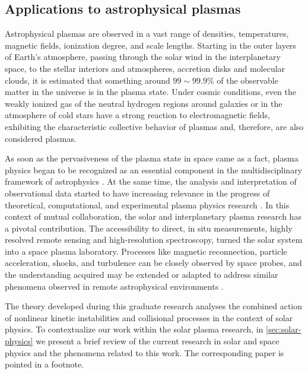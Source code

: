 \documentclass[12pt,a4paper,ruledheader]{report}
\begin{document}
\begin{appendix}
\chapter{Applications to astrophysical plasmas}
\label{appE}
Astrophysical plasmas are observed in a vast range of densities, temperatures,
magnetic fields, ionization degree, and scale lengths\cite{peratt2014}. Starting
in the outer layers of Earth's atmosphere, passing through the solar wind in the
interplanetary space, to the stellar interiors and atmospheres, accretion disks
and molecular clouds, it is estimated that something around $99 \sim 99.9\%$ of the
observable matter in the universe is in the plasma state. Under cosmic conditions,
even the weakly ionized gas of the neutral hydrogen regions around galaxies or in
the atmosphere of cold stars have a strong reaction to electromagnetic fields,
exhibiting the characteristic collective behavior of plasmas and, therefore, are
also considered plasmas\cite{tsypa,may,peratt2014}.

As soon as the pervasiveness of the plasma state in space came as a fact,
plasma physics began to be recognized as an essential component in the
multidisciplinary framework of astrophysics \cite{Alfven1950,Parker1956,
  Alfven1961,Gailitis1964,Alfven1971}. At the same time, the analysis and
interpretation of observational data started to have increasing relevance
in the progress of theoretical, computational, and experimental plasma
physics research \cite{YZKS16,Donnert2014,Pezzi2018,Howes2018,Peterson2019}.
In this context of mutual collaboration, the solar and interplanetary
plasma research has a pivotal contribution. The accessibility to direct,
in situ measurements, highly resolved remote sensing and high-resolution
spectroscopy, turned the solar system into a space plasma laboratory.
Processes like magnetic reconnection, particle acceleration, shocks, and
turbulence can be closely observed by space probes, and the understanding
acquired may be extended or adapted to address similar phenomena observed
in remote astrophysical environments \cite{NAP10477}. 

The theory developed during this graduate research analyses the combined
action of nonlinear kinetic instabilities and collisional processes in
the context of solar physics. To contextualize our work within the solar
plasma research, in \autoref{sec:solar-physics} we present a brief review
of the current research in solar and space physics and the phenomena
related to this work. The corresponding paper is pointed in a footnote.


\end{appendix}
\end{document}
